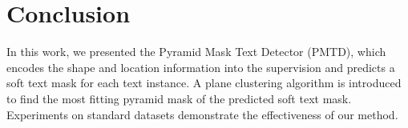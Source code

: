\documentclass[10pt,twocolumn,letterpaper]{article}
\begin{document}
 
    \section{Conclusion}\label{sec:conclusion}
    In this work, we presented the Pyramid Mask Text Detector (PMTD), which encodes the shape and location information into the supervision and predicts a soft text mask for each text instance. A plane clustering algorithm is introduced to find the most fitting pyramid mask of the predicted soft text mask. Experiments on standard datasets demonstrate the effectiveness of our method. 
    {\small
    
    
    }
\end{document}

